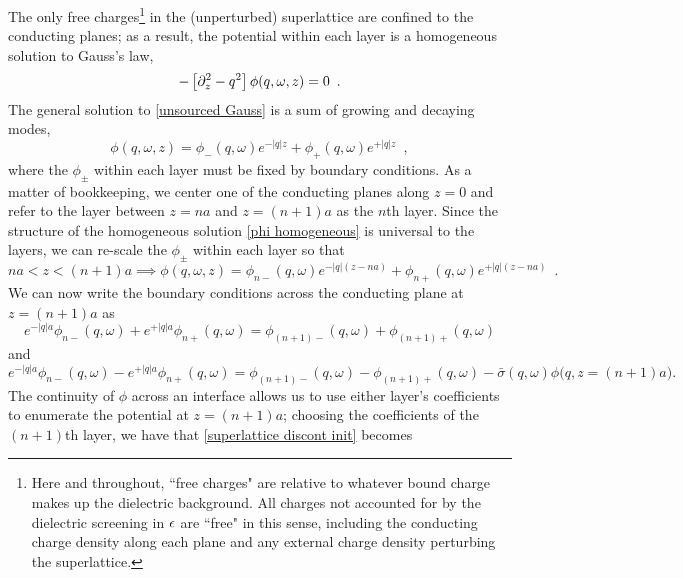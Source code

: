\documentclass{article}
\begin{document}
The only free charges\footnote{Here and throughout, ``free charges" are relative to whatever bound charge makes up the dielectric background.  All charges not accounted for by the dielectric screening in $\epsilon$ are ``free" in this sense, including the conducting charge density along each plane and any external charge density perturbing the superlattice.} in the (unperturbed) superlattice are confined to the conducting planes; as a result, the potential within each layer is a homogeneous solution to Gauss's law,
\begin{equation}
    \label{unsourced Gauss}
    -\left[\partial_z^2-q^2\right]\phi(q,\omega,z) = 0
    \,\,\,.
\end{equation}
The general solution to \eqref{unsourced Gauss} is a sum of growing and decaying modes,
\begin{equation}
    \label{phi homogeneous}
    \phi(q,\omega,z) = \phi_-(q,\omega) e^{-|q|z} + \phi_+(q,\omega) e^{+|q|z}
    \,\,\,,
\end{equation}
where the $\phi_\pm$ within each layer must be fixed by boundary conditions.  As a matter of bookkeeping, we center one of the conducting planes along $z=0$ and refer to the layer between $z=na$ and $z=(n+1)a$ as the $n$th layer.  Since the structure of the homogeneous solution \eqref{phi homogeneous} is universal to the layers, we can re-scale the $\phi_{\pm}$ within each layer so that
\begin{equation}
    \label{nth layer phi}
    na<z<(n+1)a\implies
    \phi(q,\omega,z) = \phi_{n-}(q,\omega) e^{-|q|(z-na)} + \phi_{n+}(q,\omega)e^{+|q|(z-na)}
    \,\,\,.
\end{equation}
We can now write the boundary conditions across the conducting plane at $z=(n+1)a$ as
\begin{equation}
    \label{superlattice cont init}
    e^{-|q|a} \phi_{n-}(q,\omega) + e^{+|q|a}\phi_{n+}(q,\omega) = 
    \phi_{(n+1)-}(q,\omega)+\phi_{(n+1)+}(q,\omega)
\end{equation}
and
\begin{equation}
    \label{superlattice discont init}
    e^{-|q|a} \phi_{n-}(q,\omega) - e^{+|q|a}\phi_{n+}(q,\omega) = 
    \phi_{(n+1)-}(q,\omega)-\phi_{(n+1)+}(q,\omega)
    -
    \bar\sigma(q,\omega)\phi\big(q,z=(n+1)a\big)
    .
\end{equation}
The continuity of $\phi$ across an interface allows us to use either layer's coefficients to enumerate the potential at $z=(n+1)a$; choosing the coefficients of the $(n+1)$th layer, we have that \eqref{superlattice discont init} becomes
\end{document}
